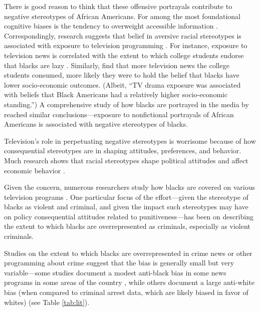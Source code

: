 \documentclass[12pt, letterpaper]{article}
\begin{document}
There is good reason to think that these offensive portrayals contribute to negative stereotypes of African Americans. For among the most foundational cognitive biases is the tendency to overweight accessible information \citep{tversky1973availability}. Correspondingly, research suggests that belief in aversive racial stereotypes is associated with exposure to television programming \citep{busselle2002television, entman2001black, armstrong1992tv}. For instance, exposure to television news is correlated with the extent to which college students endorse that blacks are lazy \citep{busselle2002television}. Similarly, \citet{armstrong1992tv} find that more television news the college students consumed, more likely they were to hold the belief that blacks have lower socio-economic outcomes. (Albeit, ``TV drama exposure was associated with beliefs that Black Americans had a relatively higher socio-economic standing.'') A comprehensive study of how blacks are portrayed in the media by \citet{entman2001black} reached similar conclusions---exposure to nonfictional portrayals of African Americans is associated with negative stereotypes of blacks.

Television's role in perpetuating negative stereotypes is worrisome because of how consequential stereotypes are in shaping attitudes, preferences, and behavior. Much research shows that racial stereotypes shape political attitudes \citep[see, for e.g.,][]{sniderman1995scar, hurwitz1997public, peffley1997racial, dixon2006psychological} and affect economic behavior \citep[see, for e.g.,][]{bertrand2004emily}.

Given the concern, numerous researchers study how blacks are covered on various television programs \citep[for e.g.,][]{entman2001black, eschholz2004images}. One particular focus of the effort---given the stereotype of blacks as violent and criminal, and given the impact such stereotypes may have on policy consequential attitudes related to punitiveness---has been on describing the extent to which blacks are overrepresented as criminals, especially as violent criminals. 

Studies on the extent to which blacks are overrepresented in crime news or other programming about crime suggest that the bias is generally small but very variable---some studies document a modest anti-black bias in some news programs in some areas of the country \citep{gilliam1996crime}, while others document a large anti-white bias (when compared to criminal arrest data, which are likely biased in favor of whites) \citep{chiricos2002racial, dixon2000overrepresentation, eschholz2004images} (see Table \ref{tab:lit}). 
\end{document}
